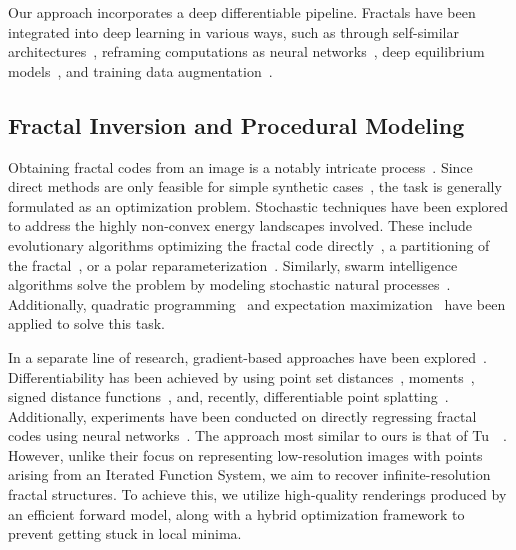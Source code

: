 Our approach incorporates a deep differentiable pipeline. 
Fractals have been integrated into deep learning in various ways, such as through self-similar architectures~\cite{li2019lightweight}, reframing computations as neural networks~\cite{stark1991iterated}, deep equilibrium models~\cite{bai2019deep}, and training data augmentation~\cite{kataoka2020pre,anderson2022improving}.


\subsection{Fractal Inversion and Procedural Modeling}
\label{sec:fractal_inversion}

Obtaining fractal codes from an image is a notably intricate process~\cite{barnsley1986solution,barnsley1988fractals,Vrscay1991}. 
Since direct methods are only feasible for simple synthetic cases~\cite{berkner1997wavelet,struzik1994solution}, the task is generally formulated as an optimization problem.
Stochastic techniques have been explored to address the highly non-convex energy landscapes involved.
These include evolutionary algorithms optimizing the fractal code directly~\cite{jacques1993optimization,nettleton1994evolutionary,lankhorst1995iterated,gutierrez2000hybrid}, a partitioning of the fractal~\cite{sarafopoulos2006resolution}, or a polar reparameterization~\cite{collet2000polar}.
Similarly, swarm intelligence algorithms solve the problem by modeling stochastic natural processes~\cite{quirce2017cuckoo,galvez2018modified,galvez2021modified}.
Additionally, quadratic programming~\cite{ForteSolving1994} and expectation maximization~\cite{bloem2017expectation} have been applied to solve this task.

In a separate line of research, gradient-based approaches have been explored~\cite{vrscay1999can}. 
Differentiability has been achieved by using point set distances~\cite{melnik1998gradient}, moments~\cite{vrscay1989iterated,rinaldo1994inverse}, signed distance functions~\cite{kim2015quaternion}, and, recently, differentiable point splatting~\cite{tu2023learning,bannister2024learnable,scott2024differentiable}. Additionally, experiments have been conducted on directly regressing fractal codes using neural networks~\cite{grahamapplying2021}.
The approach most similar to ours is that of Tu~\etal~\cite{tu2023learning}. However, unlike their focus on representing low-resolution images with points arising from an Iterated Function System, we aim to recover infinite-resolution fractal structures.
To achieve this, we utilize high-quality renderings produced by an efficient forward model, along with a hybrid optimization framework to prevent getting stuck in local minima.

